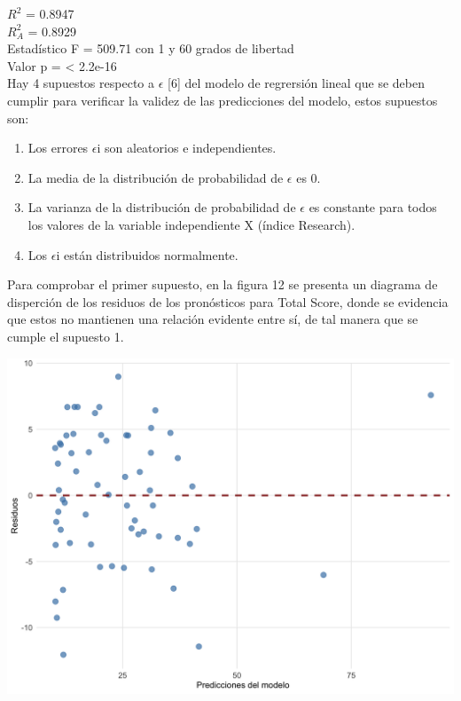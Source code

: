 \documentclass[
]{article}
\begin{document}
\begin{multicols}{2}
$R^2$ = 0.8947\\
$R^2_{A}$ = 0.8929\\
Estadístico F = 509.71 con 1 y 60 grados de libertad\\
Valor p = < 2.2e-16\\

Hay 4 supuestos respecto a $\epsilon$ [6] del modelo de regrersión lineal que se deben cumplir para verificar la validez de las predicciones del modelo, estos supuestos son: 

\begin{enumerate} [itemsep=0pt, parsep=0pt]
\item Los errores $\epsilon$i son aleatorios e independientes.
\item La media de la distribución de probabilidad de  $\epsilon$ es 0.
\item La varianza de la distribución de probabilidad de  $\epsilon$ es constante para todos los valores de la variable independiente X (índice Research).
\item Los  $\epsilon$i están distribuidos normalmente.
\end{enumerate}

Para comprobar el primer supuesto, en la figura 12 se presenta un diagrama de disperción de los residuos de los pronósticos para Total Score, donde se evidencia que estos no mantienen una relación evidente entre sí, de tal manera que se cumple el supuesto 1.


\begin{center}
\includegraphics[width=\linewidth]{figura12.png}
\end{center}


\end{multicols}
\end{document}
